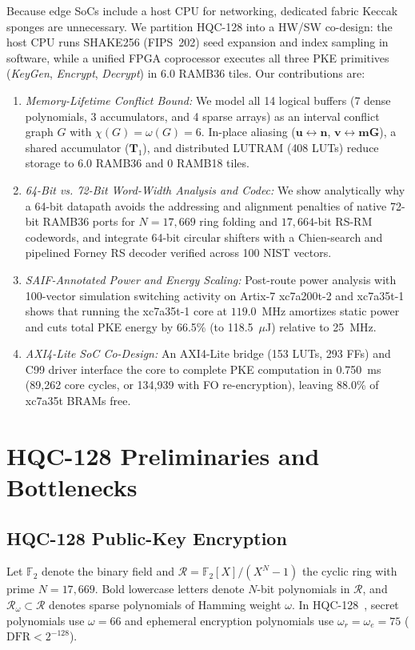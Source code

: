 \documentclass[journal]{IEEEtran}
\begin{document}
Because edge SoCs include a host CPU for networking, dedicated fabric Keccak sponges are unnecessary. We partition HQC-128 into a HW/SW co-design: the host CPU runs SHAKE256 (FIPS~202) seed expansion and index sampling in software, while a unified FPGA coprocessor executes all three PKE primitives (\textit{KeyGen}, \textit{Encrypt}, \textit{Decrypt}) in 6.0 RAMB36 tiles. Our contributions are:
\begin{enumerate}\setlength{\itemsep}{0pt}\setlength{\parsep}{0pt}\setlength{\parskip}{0pt}
    \item \textit{Memory-Lifetime Conflict Bound:} We model all 14 logical buffers (7 dense polynomials, 3 accumulators, and 4 sparse arrays) as an interval conflict graph $G$ with $\chi(G) = \omega(G) = 6$. In-place aliasing ($\mathbf{u} \leftrightarrow \mathbf{n}$, $\mathbf{v} \leftrightarrow \mathbf{mG}$), a shared accumulator ($\mathbf{T}_1$), and distributed LUTRAM (408 LUTs) reduce storage to 6.0 RAMB36 and 0 RAMB18 tiles.
    \item \textit{64-Bit vs. 72-Bit Word-Width Analysis and Codec:} We show analytically why a 64-bit datapath avoids the addressing and alignment penalties of native 72-bit RAMB36 ports for $N=17,669$ ring folding and $17,664$-bit RS-RM codewords, and integrate 64-bit circular shifters with a Chien-search and pipelined Forney RS decoder verified across 100 NIST vectors.
    \item \textit{SAIF-Annotated Power and Energy Scaling:} Post-route power analysis with 100-vector simulation switching activity on Artix-7 xc7a200t-2 and xc7a35t-1 shows that running the xc7a35t-1 core at $119.0$~MHz amortizes static power and cuts total PKE energy by 66.5\% (to 118.5~$\mu$J) relative to 25~MHz.
    \item \textit{AXI4-Lite SoC Co-Design:} An AXI4-Lite bridge (153 LUTs, 293 FFs) and C99 driver interface the core to complete PKE computation in 0.750~ms (89,262 core cycles, or 134,939 with FO re-encryption), leaving 88.0\% of xc7a35t BRAMs free.
\end{enumerate}

\section{HQC-128 Preliminaries and Bottlenecks}

\subsection{HQC-128 Public-Key Encryption}
Let $\mathbb{F}_2$ denote the binary field and $\mathcal{R} = \mathbb{F}_2[X]/(X^N - 1)$ the cyclic ring with prime $N = 17,669$. Bold lowercase letters denote $N$-bit polynomials in $\mathcal{R}$, and $\mathcal{R}_\omega \subset \mathcal{R}$ denotes sparse polynomials of Hamming weight $\omega$. In HQC-128~\cite{melchor2023hqc}, secret polynomials use $\omega = 66$ and ephemeral encryption polynomials use $\omega_r = \omega_e = 75$ ($\text{DFR} < 2^{-128}$).
\end{document}
